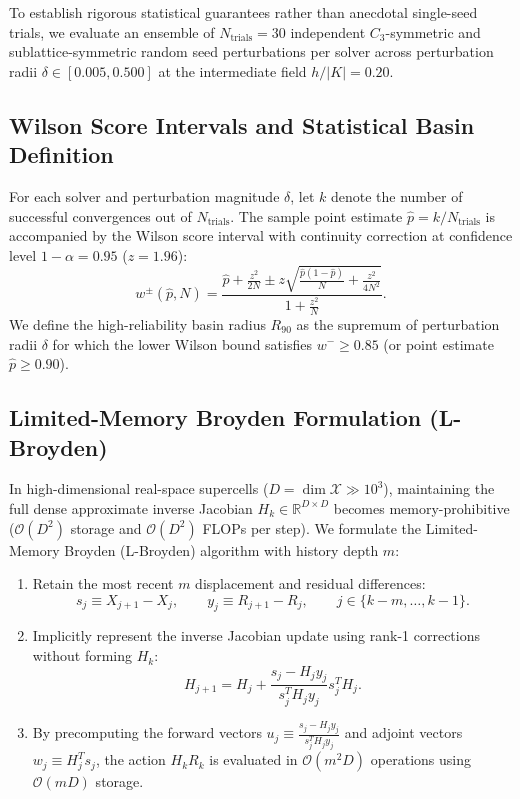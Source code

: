 To establish rigorous statistical guarantees rather than anecdotal single-seed trials, we evaluate an ensemble of $N_{\mathrm{trials}} = 30$ independent $C_3$-symmetric and sublattice-symmetric random seed perturbations per solver across perturbation radii $\delta \in [0.005, 0.500]$ at the intermediate field $h/|K| = 0.20$.

\subsection{Wilson Score Intervals and Statistical Basin Definition}
For each solver and perturbation magnitude $\delta$, let $k$ denote the number of successful convergences out of $N_{\mathrm{trials}}$. The sample point estimate $\hat{p} = k / N_{\mathrm{trials}}$ is accompanied by the Wilson score interval with continuity correction at confidence level $1 - \alpha = 0.95$ ($z = 1.96$):
\begin{equation}
\label{eq:m1_6_wilson_interval}
w^{\pm}(\hat{p}, N) = \frac{\hat{p} + \frac{z^2}{2N} \pm z \sqrt{\frac{\hat{p}(1-\hat{p})}{N} + \frac{z^2}{4N^2}}}{1 + \frac{z^2}{N}}.
\end{equation}
We define the high-reliability basin radius $R_{90}$ as the supremum of perturbation radii $\delta$ for which the lower Wilson bound satisfies $w^- \ge 0.85$ (or point estimate $\hat{p} \ge 0.90$).

\subsection{Limited-Memory Broyden Formulation (L-Broyden)}
In high-dimensional real-space supercells ($D = \dim \mathcal{X} \gg 10^3$), maintaining the full dense approximate inverse Jacobian $H_k \in \mathbb{R}^{D \times D}$ becomes memory-prohibitive ($\mathcal{O}(D^2)$ storage and $\mathcal{O}(D^2)$ FLOPs per step). We formulate the Limited-Memory Broyden (L-Broyden) algorithm with history depth $m$:
\begin{enumerate}
\item Retain the most recent $m$ displacement and residual differences:
\begin{equation}
s_j \equiv X_{j+1} - X_j, \qquad y_j \equiv R_{j+1} - R_j, \qquad j \in \{k-m, \dots, k-1\}.
\end{equation}
\item Implicitly represent the inverse Jacobian update using rank-1 corrections without forming $H_k$:
\begin{equation}
H_{j+1} = H_j + \frac{s_j - H_j y_j}{s_j^T H_j y_j} s_j^T H_j.
\end{equation}
\item By precomputing the forward vectors $u_j \equiv \frac{s_j - H_j y_j}{s_j^T H_j y_j}$ and adjoint vectors $w_j \equiv H_j^T s_j$, the action $H_k R_k$ is evaluated in $\mathcal{O}(m^2 D)$ operations using $\mathcal{O}(mD)$ storage.
\end{enumerate}

